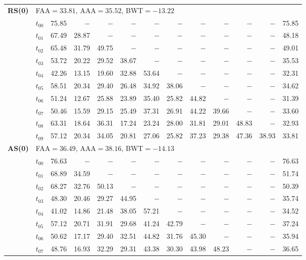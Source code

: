 \begin{table}[ht]
\begin{tabular}{@{}l l r r r r r r r r r r r@{}}
\multirow{11}{*}{\textbf{RS(0)}} & \multicolumn{12}{l}{\quad\small FAA$=33.81$,\; AAA$=35.52$,\; BWT$=-13.22$} \\
 & $t_{00}$ & 75.85 & $-$ & $-$ & $-$ & $-$ & $-$ & $-$ & $-$ & $-$ & $-$ & 75.85 \\
 & $t_{01}$ & 67.49 & 28.87 & $-$ & $-$ & $-$ & $-$ & $-$ & $-$ & $-$ & $-$ & 48.18 \\
 & $t_{02}$ & 65.48 & 31.79 & 49.75 & $-$ & $-$ & $-$ & $-$ & $-$ & $-$ & $-$ & 49.01 \\
 & $t_{03}$ & 53.72 & 20.22 & 29.52 & 38.67 & $-$ & $-$ & $-$ & $-$ & $-$ & $-$ & 35.53 \\
 & $t_{04}$ & 42.26 & 13.15 & 19.60 & 32.88 & 53.64 & $-$ & $-$ & $-$ & $-$ & $-$ & 32.31 \\
 & $t_{05}$ & 58.51 & 20.34 & 29.40 & 26.48 & 34.92 & 38.06 & $-$ & $-$ & $-$ & $-$ & 34.62 \\
 & $t_{06}$ & 51.24 & 12.67 & 25.88 & 23.89 & 35.40 & 25.82 & 44.82 & $-$ & $-$ & $-$ & 31.39 \\
 & $t_{07}$ & 50.46 & 15.59 & 29.15 & 25.49 & 37.31 & 26.91 & 44.22 & 39.66 & $-$ & $-$ & 33.60 \\
 & $t_{08}$ & 63.31 & 18.64 & 36.31 & 17.24 & 23.24 & 28.00 & 31.81 & 29.01 & 48.83 & $-$ & 32.93 \\
 & $t_{09}$ & 57.12 & 20.34 & 34.05 & 20.81 & 27.06 & 25.82 & 37.23 & 29.38 & 47.36 & 38.93 & 33.81 \\
\midrule
\multirow{11}{*}{\textbf{AS(0)}} & \multicolumn{12}{l}{\quad\small FAA$=36.49$,\; AAA$=38.16$,\; BWT$=-14.13$} \\
 & $t_{00}$ & 76.63 & $-$ & $-$ & $-$ & $-$ & $-$ & $-$ & $-$ & $-$ & $-$ & 76.63 \\
 & $t_{01}$ & 68.89 & 34.59 & $-$ & $-$ & $-$ & $-$ & $-$ & $-$ & $-$ & $-$ & 51.74 \\
 & $t_{02}$ & 68.27 & 32.76 & 50.13 & $-$ & $-$ & $-$ & $-$ & $-$ & $-$ & $-$ & 50.39 \\
 & $t_{03}$ & 48.30 & 20.46 & 29.27 & 44.95 & $-$ & $-$ & $-$ & $-$ & $-$ & $-$ & 35.74 \\
 & $t_{04}$ & 41.02 & 14.86 & 21.48 & 38.05 & 57.21 & $-$ & $-$ & $-$ & $-$ & $-$ & 34.52 \\
 & $t_{05}$ & 57.12 & 20.71 & 31.91 & 29.68 & 41.24 & 42.79 & $-$ & $-$ & $-$ & $-$ & 37.24 \\
 & $t_{06}$ & 50.62 & 17.17 & 29.40 & 32.51 & 44.82 & 31.76 & 45.30 & $-$ & $-$ & $-$ & 35.94 \\
 & $t_{07}$ & 48.76 & 16.93 & 32.29 & 29.31 & 43.38 & 30.30 & 43.98 & 48.23 & $-$ & $-$ & 36.65 \\

\end{tabular}
\end{table}
